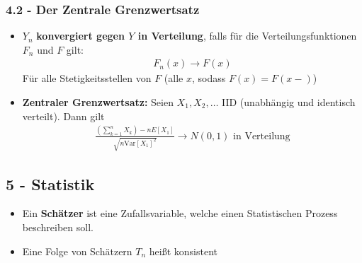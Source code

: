 \documentclass{scrartcl}
\newcommand{\var}{\text{Var}}
\begin{document}
\subsubsection*{4.2 - Der Zentrale Grenzwertsatz}
\begin{itemize}
    \item $Y_n$ \textbf{konvergiert gegen $Y$ in Verteilung}, falls für die Verteilungsfunktionen $F_n$ und $F$ gilt:
    \begin{align*}
        F_n(x) \to F(x)
    \end{align*}
    Für alle Stetigkeitsstellen von $F$ (alle $x$, sodass $F(x) = F(x-)$)
    \item \textbf{Zentraler Grenzwertsatz:} Seien $X_1, X_2, \hdots$ IID (unabhängig und identisch verteilt). Dann gilt 
    \begin{align*}
        \frac{(\sum_{k=1}^n X_k) - nE[X_1]}{\sqrt{n\var[X_1]^2}} \to N(0,1) \text{ in Verteilung} 
    \end{align*}
\end{itemize}
\subsection*{5 - Statistik}
\begin{itemize}
    \item Ein \textbf{Schätzer} ist eine Zufallsvariable, welche einen Statistischen Prozess beschreiben soll.
    \item Eine Folge von Schätzern $T_n$ heißt konsistent
\end{itemize}
\end{document}

